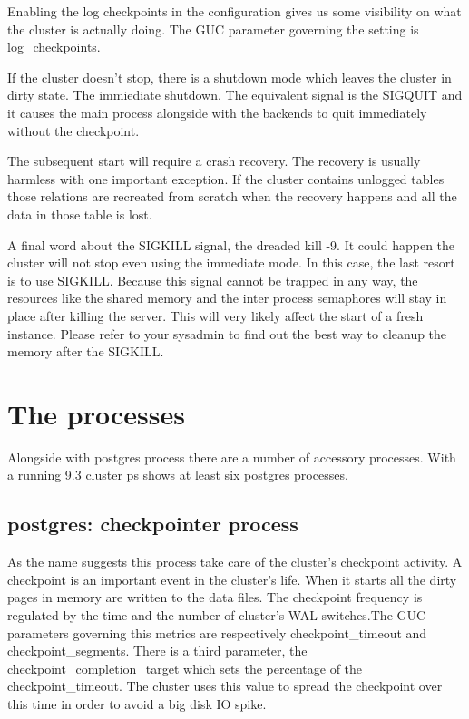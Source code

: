 Enabling the log checkpoints in the configuration gives us some visibility on what the cluster is
actually doing. The GUC parameter governing the setting is log\_checkpoints.\newline


If the cluster doesn't stop, there is a shutdown mode which leaves the cluster in dirty state.
The immiediate shutdown. The equivalent signal is the SIGQUIT and it causes the main process
alongside with the backends to quit immediately without the checkpoint.\newline

The subsequent start will require a crash recovery. The recovery is usually harmless with one
important exception. If the cluster contains unlogged tables those relations are recreated from
scratch when the recovery happens and all the data in those table is lost.

A final word about the SIGKILL signal, the dreaded kill -9. It could happen the cluster will not stop even 
using the immediate mode. In this case, the last resort is to use SIGKILL. Because this signal
cannot be trapped in any way, the resources like the shared memory and the inter process semaphores
will stay in place after killing the server. This will very likely affect the start of a fresh instance.
Please refer to your sysadmin to find out the best way to cleanup the memory after the
SIGKILL.

\section{The processes}
\label{sec:PROCESSES}
Alongside with postgres process there are a number of accessory processes. With a running 9.3
cluster ps shows at least six postgres processes. 

\subsection{postgres: checkpointer process}
As the name suggests this process take care of the cluster's checkpoint activity.
A checkpoint is an important event in the cluster's life. When it starts all the dirty pages in
memory are written to the data files. The checkpoint frequency is regulated by the time and the
number of cluster's WAL switches.The GUC parameters governing this metrics are respectively
checkpoint\_timeout and checkpoint\_segments.
There is a third parameter, the checkpoint\_completion\_target
which sets the percentage of the checkpoint\_timeout. The cluster uses this value to spread the
checkpoint over this time in order to avoid a big disk IO spike.

